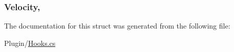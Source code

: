 \subsubsection[{Velocity}]{ Velocity\hspace{0.3cm}{\ttfamily [get]}, {\ttfamily [set]}}\label{structOTA_1_1Plugin_1_1HookArgs_1_1ProjectileReceived_a9270bc95559fa30ee69c62e4d4c427b6}


The documentation for this struct was generated from the following file\+:\begin{DoxyCompactItemize}
\item 
Plugin/\hyperlink{Hooks_8cs}{Hooks.\+cs}\end{DoxyCompactItemize}
